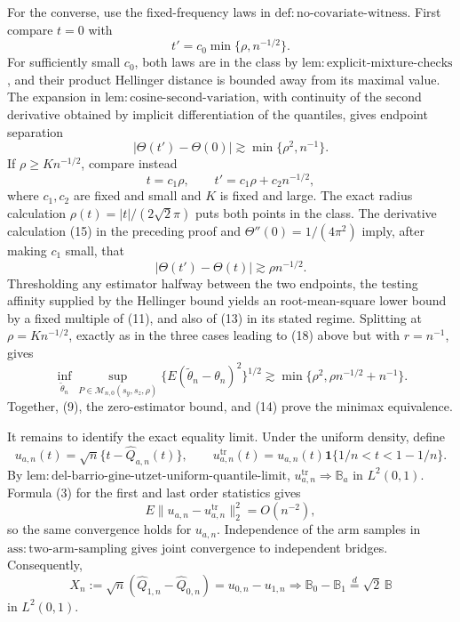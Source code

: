 For the converse, use the fixed-frequency laws in
\(\mathrm{def{:}no\text{-}covariate\text{-}witness}\).  First compare \(t=0\) with
\[
t'=c_0\min\{\rho,n^{-1/2}\}.                               \tag{10}
\]
For sufficiently small \(c_0\), both laws are in the class by
\(\mathrm{lem{:}explicit\text{-}mixture\text{-}checks}\), and their product Hellinger distance is bounded away from its maximal value.  The expansion in
\(\mathrm{lem{:}cosine\text{-}second\text{-}variation}\), with continuity of the second derivative obtained by implicit differentiation of the quantiles, gives endpoint separation
\[
|\Theta(t')-\Theta(0)|\gtrsim\min\{\rho^2,n^{-1}\}.        \tag{11}
\]
If \(\rho\ge K n^{-1/2}\), compare instead
\[
t=c_1\rho,
\qquad t'=c_1\rho+c_2n^{-1/2},                              \tag{12}
\]
where \(c_1,c_2\) are fixed and small and \(K\) is fixed and large.  The exact radius calculation
\(\rho(t)=|t|/(2\sqrt2\pi)\) puts both points in the class.  The derivative calculation (15) in the preceding proof and
\(\Theta''(0)=1/(4\pi^2)\) imply, after making \(c_1\) small, that
\[
|\Theta(t')-\Theta(t)|\gtrsim\rho n^{-1/2}.                 \tag{13}
\]
Thresholding any estimator halfway between the two endpoints, the testing affinity supplied by the Hellinger bound yields an root-mean-square lower bound by a fixed multiple of (11), and also of (13) in its stated regime.  Splitting at \(\rho=K n^{-1/2}\), exactly as in the three cases leading to (18) above but with \(r=n^{-1}\), gives
\[
\inf_{\widetilde\theta_n}
\sup_{P\in\mathcal M_{n,0}(s_y,s_z,\rho)}
\{E(\widetilde\theta_n-\theta_n)^2\}^{1/2}
\gtrsim\min\{\rho^2,\rho n^{-1/2}+n^{-1}\}.              \tag{14}
\]
Together, (9), the zero-estimator bound, and (14) prove the minimax equivalence.

It remains to identify the exact equality limit.  Under the uniform density, define
\[
u_{a,n}(t)=\sqrt n\{t-\widehat Q_{a,n}(t)\},
\qquad
u_{a,n}^{\mathrm{tr}}(t)=u_{a,n}(t)\mathbf1\{1/n<t<1-1/n\}.
\]
By
\(\mathrm{lem{:}del\text{-}barrio\text{-}gine\text{-}utzet\text{-}uniform\text{-}quantile\text{-}limit}\),
\(u_{a,n}^{\mathrm{tr}}\Rightarrow\mathbb B_a\) in \(L^2(0,1)\).  Formula (3) for the first and last order statistics gives
\[
E\|u_{a,n}-u_{a,n}^{\mathrm{tr}}\|_2^2=O(n^{-2}),          \tag{15}
\]
so the same convergence holds for \(u_{a,n}\).  Independence of the arm samples in
\(\mathrm{ass{:}two\text{-}arm\text{-}sampling}\) gives joint convergence to independent bridges.  Consequently,
\[
X_n:=\sqrt n(\widehat Q_{1,n}-\widehat Q_{0,n})
=u_{0,n}-u_{1,n}
\Rightarrow\mathbb B_0-\mathbb B_1
\stackrel{d}=\sqrt2\,\mathbb B                              \tag{16}
\]
in \(L^2(0,1)\).

